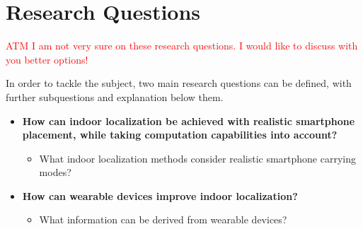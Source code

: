 


\newpage
\section{Research Questions}
\textcolor{red}{ATM I am not very sure on these research questions. I would like to discuss with you better options!}

In order to tackle the subject, two main research questions can be defined, with further subquestions and explanation below them.

\begin{itemize}
	\item \textbf{How can indoor localization be achieved with realistic smartphone placement, while taking computation capabilities into account?}
	\begin{itemize}
		\item What indoor localization methods consider realistic smartphone carrying modes? 
	\end{itemize}
	\item\textbf{How can wearable devices improve indoor localization?}
	\begin{itemize}
		\item What information can be derived from wearable devices?
	\end{itemize}
\end{itemize}

